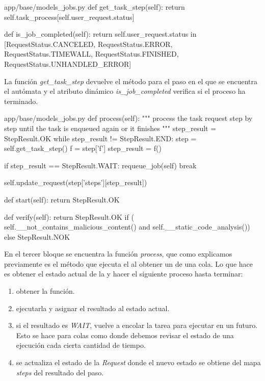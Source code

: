 \documentclass[11pt,spanish,listoffigures,listoftables]{tfgetsinf}
\begin{document}
\begin{code}{app/base/models\_jobs.py}
	def get_task_step(self):
		return self.task_process[self.user_request.status]
	
	def is_job_completed(self):
		return self.user_request.status in [RequestStatus.CANCELED, RequestStatus.ERROR, RequestStatus.TIMEWALL,
		RequestStatus.FINISHED, RequestStatus.UNHANDLED_ERROR]
\end{code}

La función \textit{get\_task\_step} devuelve el método para el paso en el que se encuentra el autómata y el atributo dinámico \textit{is\_job\_completed} verifica si el proceso ha terminado. \newline 

\begin{code}{app/base/models\_jobs.py}
	def process(self):
		"""
		process the task request step by step until the task is enqueued again or it finishes
		"""
		step_result = StepResult.OK
		while step_result != StepResult.END:
			step = self.get_task_step()
			f = step['f']
			step_result = f()
			
			if step_result == StepResult.WAIT:
				requeue_job(self)
				break
				
			self.update_request(step['steps'][step_result])
	
	def start(self):
		return StepResult.OK
	
	def verify(self):
		return StepResult.OK if (
	self.__not_contains_malicious_content() and self.__static_code_analysis()) else StepResult.NOK
\end{code}

En el tercer bloque se encuentra la función \textit{process}, que como explicamos previamente es el método que ejecuta el  al obtener un  de una \gls{cola}. Lo que hace es obtener el estado actual de la  y hacer el siguiente proceso hasta terminar:

\begin{enumerate}
	\item obtener la función.
	\item ejecutarla y asignar el resultado al estado actual.
	\item si el resultado es \textit{WAIT}, vuelve a encolar la tarea para ejecutar en un futuro. Esto se hace para \gls{cola}s como \kahan donde debemos revisar el estado de una ejecución cada cierta cantidad de tiempo.
	\item se actualiza el estado de la \textit{Request} donde el nuevo estado se obtiene del mapa \textit{steps} del resultado del paso.
\end{enumerate}
\end{document}
